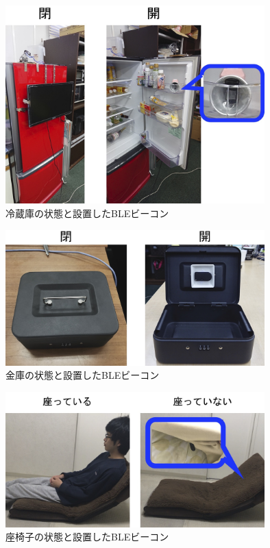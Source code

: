 \begin{figure}[H]
    \centering
    \includegraphics[width=10cm]{images/chapter3/regisW2.jpg}
    \caption{冷蔵庫の状態と設置したBLEビーコン}
    \label{freezer}
\end{figure}


\begin{figure}[H]
    \centering
    \includegraphics[width=10cm]{images/chapter3/kinkoW.jpg}
    \caption{金庫の状態と設置したBLEビーコン}
    \label{safe}
\end{figure}


\begin{figure}[H]
    \centering
    \includegraphics[width=10cm]{images/chapter3/zaisuW.jpg}
    \caption{座椅子の状態と設置したBLEビーコン}
    \label{chair}
\end{figure}


